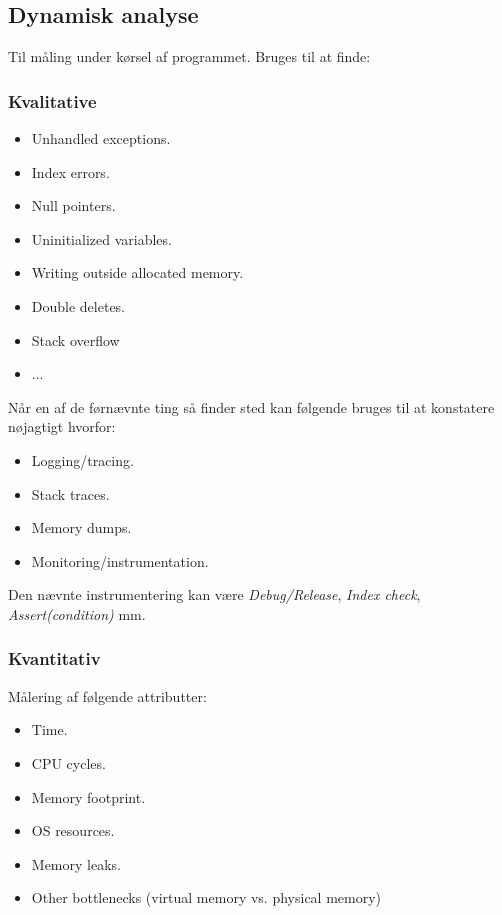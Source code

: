 \subsection{Dynamisk analyse}
Til måling under kørsel af programmet. Bruges til at finde: 

\subsubsection{Kvalitative}

\begin{itemize}
	\item Unhandled exceptions.
	\item Index errors.
	\item Null pointers.
	\item Uninitialized variables.
	\item Writing outside allocated memory.
	\item Double deletes.
	\item Stack overflow
	\item ...
\end{itemize}

Når en af de førnævnte ting så finder sted kan følgende bruges til at konstatere nøjagtigt hvorfor:

\begin{itemize}
	\item Logging/tracing.
	\item Stack traces.
	\item Memory dumps.
	\item Monitoring/instrumentation.
\end{itemize}

Den nævnte instrumentering kan være \textit{Debug/Release}, \textit{Index check}, \textit{Assert(condition)} mm.

\subsubsection{Kvantitativ}
Målering af følgende attributter:

\begin{itemize}
	\item Time.
	\item CPU cycles.
	\item Memory footprint.
	\item OS resources.
	\item Memory leaks.
	\item Other bottlenecks (virtual memory vs. physical memory)
\end{itemize}


